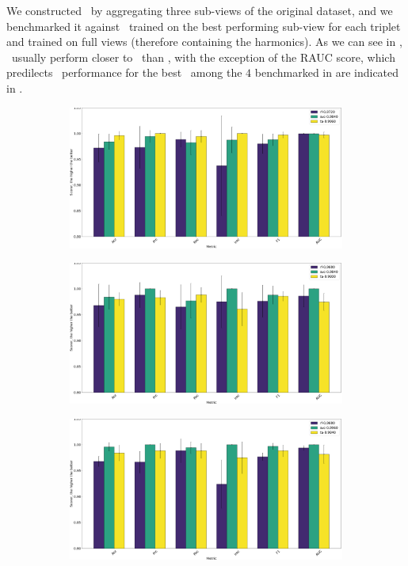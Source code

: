 We constructed \tas\ by aggregating three sub-views of the original dataset, and we benchmarked it
against \rfs\ trained on the best performing sub-view for each triplet and \svcs trained on full views (therefore
containing the harmonics). As we can see in , \tas\ usually perform
closer to \svcs\ than \rfs, with the exception of the RAUC score, which predilects \rfs\,
performance for the best \ta\ among the $4$ benchmarked in  are
indicated in .
\begin{figure}[!h]
	\centering
	\begin{subfigure}{0.49\linewidth}
		\includegraphics[width=\linewidth]{img/An_Bn_Cnmod_ta.png}
		\subcaption{\an, \bn, \cnmod}
	\end{subfigure}
	\begin{subfigure}{0.49\linewidth}
		\includegraphics[width=\linewidth]{img/An_Bn_Phi_ta.png}
		\subcaption{\an, \bn, \phin}
	\end{subfigure}
	\begin{subfigure}{0.49\linewidth}
		\includegraphics[width=\linewidth]{img/An_Cnmod_Phi_ta.png}

\end{subfigure}
\end{figure}
